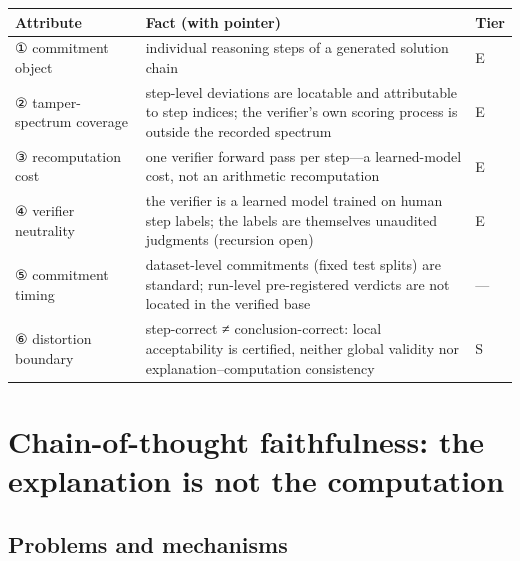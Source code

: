 \documentclass[11pt,a4paper]{article}
\begin{document}
\begin{table}[htbp]
\centering
\footnotesize
\setlength{\tabcolsep}{3.5pt}
\renewcommand{\arraystretch}{1.18}
\begin{tabularx}{0.985\textwidth}{>{\raggedright\arraybackslash}p{} >{\raggedright\arraybackslash}X >{\raggedright\arraybackslash}p{}}
\toprule
\textbf{Attribute} & \textbf{Fact (with pointer)} & \textbf{Tier} \\
\midrule
① commitment object & individual reasoning steps of a generated solution chain \cite{key05,key06} & E \\
② tamper-spectrum coverage & step-level deviations are locatable and attributable to step indices; the verifier's own scoring process is outside the recorded spectrum \cite{key05,key06} & E \\
③ recomputation cost & one verifier forward pass per step—a learned-model cost, not an arithmetic recomputation \cite{key06} & E \\
④ verifier neutrality & the verifier is a learned model trained on human step labels; the labels are themselves unaudited judgments (recursion open) \cite{key06} & E \\
⑤ commitment timing & dataset-level commitments (fixed test splits) are standard; run-level pre-registered verdicts are not located in the verified base & — \\
⑥ distortion boundary & step-correct ≠ conclusion-correct: local acceptability is certified, neither global validity nor explanation–computation consistency & S \\
\bottomrule
\end{tabularx}
\end{table}

\section{Chain-of-thought faithfulness: the explanation is not the computation}

\subsection{Problems and mechanisms}
\end{document}
